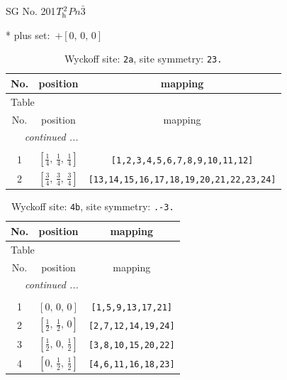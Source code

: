 \documentclass[fleqn,8pt]{jsarticle}
\begin{document}
\setcounter{MaxMatrixCols}{32}

\renewcommand{\tablename}{Table~}
\renewcommand{\figurename}{Figure~}
\begin{center}
\LARGE
SG No. 201\quad$T_{\rm h}^{2}$\quad$Pn\bar{3}$\quad[ cubic ]
\end{center}
* plus set:\,\,\,$+\left[ 0,\, 0,\, 0 \right]$
\renewcommand{\arraystretch}{1.2}
\begin{longtable}{ccc}
\caption{Wyckoff site: {\tt 2a}, site symmetry: {\tt 23.}}
 \\
 \hline \hline
No. & position & mapping \\ \hline \endfirsthead

\multicolumn{2}{l}{\tablename\ \thetable{}} \\
 \hline \hline
No. & position & mapping \\ \hline \endhead

 \hline \hline
\multicolumn{2}{r}{\footnotesize\it continued ...} \\ \endfoot

 \hline \hline
\multicolumn{2}{r}{} \\ \endlastfoot

1 & $\left[ \frac{1}{4},\, \frac{1}{4},\, \frac{1}{4} \right]$ & {\tt [1,2,3,4,5,6,7,8,9,10,11,12]} \\ \hline
2 & $\left[ \frac{3}{4},\, \frac{3}{4},\, \frac{3}{4} \right]$ & {\tt [13,14,15,16,17,18,19,20,21,22,23,24]} \\
\end{longtable}
\renewcommand{\arraystretch}{1.2}
\begin{longtable}{ccc}
\caption{Wyckoff site: {\tt 4b}, site symmetry: {\tt .-3.}}
 \\
 \hline \hline
No. & position & mapping \\ \hline \endfirsthead

\multicolumn{2}{l}{\tablename\ \thetable{}} \\
 \hline \hline
No. & position & mapping \\ \hline \endhead

 \hline \hline
\multicolumn{2}{r}{\footnotesize\it continued ...} \\ \endfoot

 \hline \hline
\multicolumn{2}{r}{} \\ \endlastfoot

1 & $\left[ 0,\, 0,\, 0 \right]$ & {\tt [1,5,9,13,17,21]} \\ \hline
2 & $\left[ \frac{1}{2},\, \frac{1}{2},\, 0 \right]$ & {\tt [2,7,12,14,19,24]} \\ \hline
3 & $\left[ \frac{1}{2},\, 0,\, \frac{1}{2} \right]$ & {\tt [3,8,10,15,20,22]} \\ \hline
4 & $\left[ 0,\, \frac{1}{2},\, \frac{1}{2} \right]$ & {\tt [4,6,11,16,18,23]} \\
\end{longtable}
\end{document}
